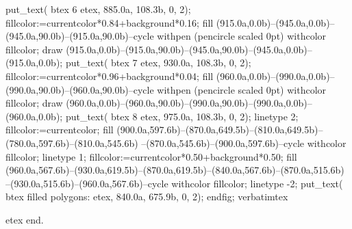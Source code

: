 put_text( btex  6 etex, 885.0a, 108.3b, 0, 2);
fillcolor:=currentcolor*0.84+background*0.16;
fill (915.0a,0.0b)--(945.0a,0.0b)--(945.0a,90.0b)--(915.0a,90.0b)--cycle withpen (pencircle scaled 0pt) withcolor fillcolor;
draw (915.0a,0.0b)--(915.0a,90.0b)--(945.0a,90.0b)--(945.0a,0.0b)--(915.0a,0.0b);
put_text( btex  7 etex, 930.0a, 108.3b, 0, 2);
fillcolor:=currentcolor*0.96+background*0.04;
fill (960.0a,0.0b)--(990.0a,0.0b)--(990.0a,90.0b)--(960.0a,90.0b)--cycle withpen (pencircle scaled 0pt) withcolor fillcolor;
draw (960.0a,0.0b)--(960.0a,90.0b)--(990.0a,90.0b)--(990.0a,0.0b)--(960.0a,0.0b);
put_text( btex  8 etex, 975.0a, 108.3b, 0, 2);
linetype 2;
fillcolor:=currentcolor;
fill (900.0a,597.6b)--(870.0a,649.5b)--(810.0a,649.5b)--(780.0a,597.6b)--(810.0a,545.6b)
--(870.0a,545.6b)--(900.0a,597.6b)--cycle withcolor fillcolor;
linetype 1;
fillcolor:=currentcolor*0.50+background*0.50;
fill (960.0a,567.6b)--(930.0a,619.5b)--(870.0a,619.5b)--(840.0a,567.6b)--(870.0a,515.6b)
--(930.0a,515.6b)--(960.0a,567.6b)--cycle withcolor fillcolor;
linetype -2;
put_text( btex filled polygons: etex, 840.0a, 675.9b, 0, 2);
endfig;
verbatimtex
 
etex
end.
